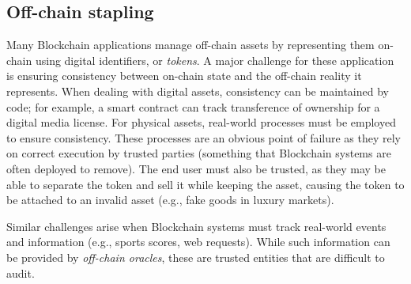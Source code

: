 \subsection{Off-chain stapling}
Many Blockchain applications manage off-chain assets by representing them 
on-chain using digital identifiers, or \textit{tokens}. A major challenge for 
these application is ensuring consistency between on-chain state and the 
off-chain reality it represents.
When dealing with digital assets, consistency can be maintained by code; for 
example, a smart contract can track transference of ownership for a digital 
media license.
For physical assets, real-world processes must be employed to ensure 
consistency. These processes are an obvious point of failure as they rely on 
correct execution by trusted parties (something that Blockchain systems are 
often deployed to remove).
The end user must also be trusted, as they may be able to separate the token and sell it while keeping the asset, causing the token to be attached to an invalid asset (e.g., fake goods in luxury markets).

Similar challenges arise when Blockchain systems must track real-world events and information (e.g., sports scores, web requests).
While such information can be provided by \emph{off-chain oracles}, these are trusted entities that are difficult to audit.


